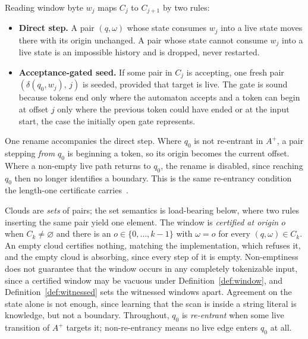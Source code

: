 \documentclass[11pt,a4paper]{article}
\theoremstyle{definition}
\theoremstyle{plain}
\begin{document}
Reading window byte $w_j$ maps $C_j$ to $C_{j+1}$ by two rules:

\begin{itemize}
\item \textbf{Direct step.} A pair $(q, \omega)$ whose state consumes $w_j$ into a live state moves there with its
origin unchanged. A pair whose state cannot consume $w_j$ into a live state is an impossible history and is dropped,
never restarted.
\item \textbf{Acceptance-gated seed.} If some pair in $C_j$ is accepting, one fresh pair $(\delta(q_0, w_j),\, j)$ is
seeded, provided that target is live. The gate is sound because tokens end only where the automaton accepts and a token
can begin at offset $j$ only where the previous token could have ended or at the input start, the case the initially
open gate represents.
\end{itemize}

One rename accompanies the direct step. Where $q_0$ is not re-entrant in $A^+$, a pair stepping \emph{from} $q_0$ is
beginning a token, so its origin becomes the current offset. Where a non-empty live path returns to $q_0$, the rename is
disabled, since reaching $q_0$ then no longer identifies a boundary. This is the same re-entrancy condition the
length-one certificate carries~\cite{nidhogg2026splitpoints}.

Clouds are \emph{sets} of pairs; the set semantics is load-bearing below, where two rules inserting the same pair yield
one element. The window is \emph{certified at origin $o$} when $C_k \neq \varnothing$ and there is an
$o \in \{0, \ldots, k-1\}$ with $\omega = o$ for every $(q, \omega) \in C_k$. An empty cloud certifies nothing, matching
the implementation, which refuses it, and the empty cloud is absorbing, since every step of it is empty. Non-emptiness
does not guarantee that the window occurs in any completely tokenizable input, since a certified window may be vacuous
under Definition~\ref{def:window}, and Definition~\ref{def:witnessed} sets the witnessed windows apart. Agreement on the
state alone is not enough, since learning that the scan is inside a string literal is knowledge, but not a boundary.
Throughout, $q_0$ is \emph{re-entrant} when some live transition of $A^+$ targets it; non-re-entrancy means no live edge
enters $q_0$ at all.
\end{document}
